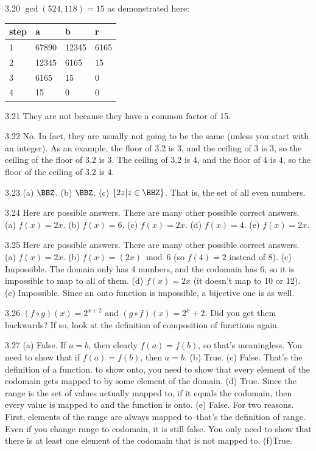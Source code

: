\begin{RequAnswer}{3.20}
$\gcd(524,118)=15$ as demonstrated here:

\begin{tabular}{|l|l|l|l|}
\hline
step&a&b&r\\
\hline
\hline
1&67890&12345&6165\\
\hline
2&12345&6165&15\\
\hline
3&6165&15&0\\
\hline
4&15&0&0\\
\hline
\end{tabular}
\end{RequAnswer}
\begin{RequAnswer}{3.21}
They are not because they have a common factor of 15.
\end{RequAnswer}
\begin{RequAnswer}{3.22}
No. In fact, they are usually not going to be the same (unless you start with an integer).
As an example, the floor of 3.2 is 3, and the ceiling of 3 is 3, so the ceiling of the floor of 3.2 is 3.
The ceiling of 3.2 is 4, and the floor of 4 is 4, so the floor of the ceiling of 3.2 is 4.
\end{RequAnswer}
\begin{RequAnswer}{3.23}
(a) $\BBZ$. (b) $\BBZ$. (c) $\{2z | z\in\BBZ\}$. That is, the set of all even numbers.
\end{RequAnswer}
\begin{RequAnswer}{3.24}
Here are possible answers. There are many other possible correct answers.
(a) $f(x)=2x$.
(b) $f(x)=6$.
(c) $f(x)=2x$.
(d) $f(x)=4$.
(e) $f(x)=2x$.
\end{RequAnswer}
\begin{RequAnswer}{3.25}
Here are possible answers. There are many other possible correct answers.
(a) $f(x)=2x$.
(b) $f(x)=(2x)\bmod 6$ (so $f(4)=2$ instead of 8).
(c) Impossible. The domain only has 4 numbers, and the codomain has 6, so it is impossible to map to all of them.
(d) $f(x)=2x$ (it doesn't map to 10 or 12).
(e) Impossible. Since an onto function is impossible, a bijective one is as well.
\end{RequAnswer}
\begin{RequAnswer}{3.26}
$(f\circ g)(x)=2^{x+2}$ and $(g\circ f)(x)=2^x+2$.
Did you get them backwards? If so, look at the definition of composition of functions again.
\end{RequAnswer}
\begin{RequAnswer}{3.27}
(a) False. If $a=b$, then clearly $f(a)=f(b)$, so that's meaningless. You need to show that if $f(a)=f(b)$, then $a=b$.
(b) True.
(c) False. That's the definition of a function. to show onto, you need to show that every element of the codomain
gets mapped to by some element of the domain.
(d) True. Since the range is the set of values actually mapped to, if it equals the codomain, then every value is mapped
to and the function is onto.
(e) False. For two reasons. First, elements of the range are always mapped to--that's the definition of range.
Even if you change range to codomain, it is still false. You only need to show that there is at least one element of the
codomain that is not mapped to.
(f)True.
\end{RequAnswer}
